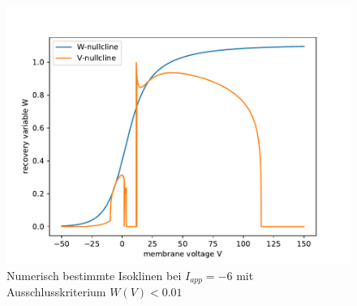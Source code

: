 \documentclass[12pt,a4paper]{article}
\begin{document}
\begin{figure}[H]
	\centering
	\includegraphics[scale=1]{rinzelclinescoredge2.pdf}\caption{Numerisch bestimmte Isoklinen bei $I_{app}=-6$ mit Ausschlusskriterium $W(V)<0.01$}
	\label{rinzelclinescoredge}
\end{figure}
\end{document}
